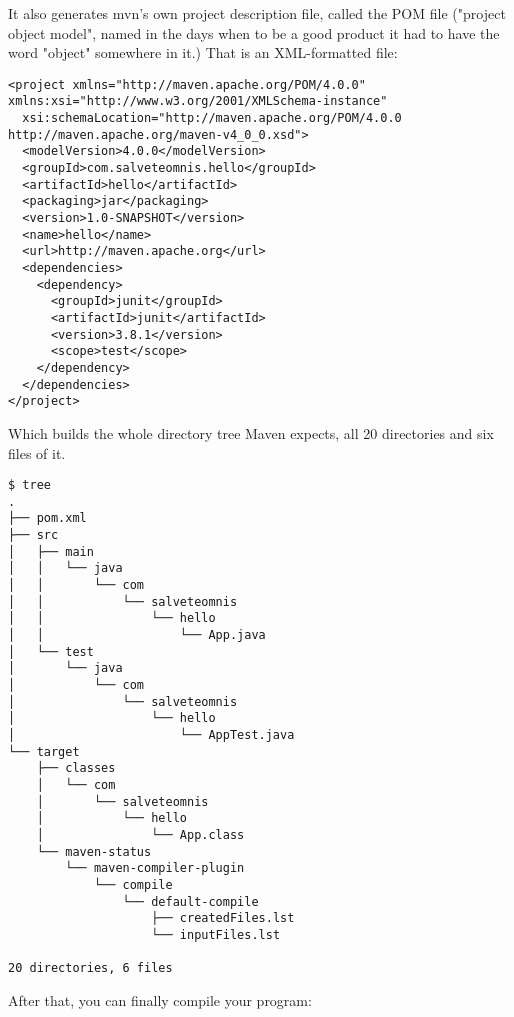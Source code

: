 \documentclass[11pt]{article}
\begin{document}
It also generates mvn's own project description file, called the POM
file ("project object model", named in the days when to be a good
product it had to have the word "object" somewhere in it.)  That is an
XML-formatted file:

\begin{verbatim}
<project xmlns="http://maven.apache.org/POM/4.0.0" xmlns:xsi="http://www.w3.org/2001/XMLSchema-instance"
  xsi:schemaLocation="http://maven.apache.org/POM/4.0.0 http://maven.apache.org/maven-v4_0_0.xsd">
  <modelVersion>4.0.0</modelVersion>
  <groupId>com.salveteomnis.hello</groupId>
  <artifactId>hello</artifactId>
  <packaging>jar</packaging>
  <version>1.0-SNAPSHOT</version>
  <name>hello</name>
  <url>http://maven.apache.org</url>
  <dependencies>
    <dependency>
      <groupId>junit</groupId>
      <artifactId>junit</artifactId>
      <version>3.8.1</version>
      <scope>test</scope>
    </dependency>
  </dependencies>
</project>
\end{verbatim}

Which builds the whole directory tree Maven expects, all 20
directories and six files of it.

\begin{verbatim}
$ tree
.
├── pom.xml
├── src
│   ├── main
│   │   └── java
│   │       └── com
│   │           └── salveteomnis
│   │               └── hello
│   │                   └── App.java
│   └── test
│       └── java
│           └── com
│               └── salveteomnis
│                   └── hello
│                       └── AppTest.java
└── target
    ├── classes
    │   └── com
    │       └── salveteomnis
    │           └── hello
    │               └── App.class
    └── maven-status
        └── maven-compiler-plugin
            └── compile
                └── default-compile
                    ├── createdFiles.lst
                    └── inputFiles.lst

20 directories, 6 files
\end{verbatim}

After that, you can finally compile your program:
\end{document}
